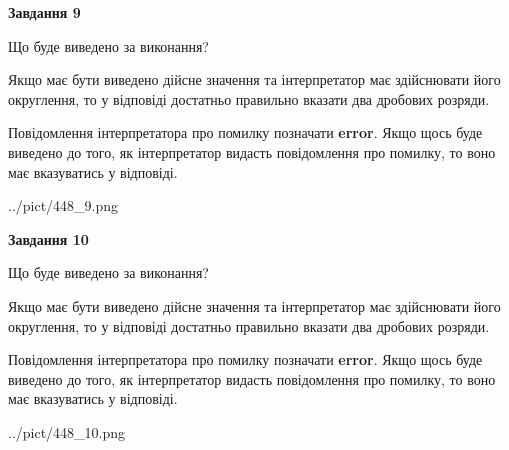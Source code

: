 \documentclass[12pt, ukrainian]{article}
\begin{document}
{\begin {Large}
{\begin {center}\textbf{Завдання 9}\end {center}}\par
Що буде виведено за виконання? \par

Якщо має бути виведено дійсне значення та інтерпретатор має здійснювати його округлення, 
то у відповіді достатньо правильно вказати два дробових розряди.

Повідомлення інтерпретатора про помилку позначати \textbf{error}.
Якщо щось буде виведено до того, як інтерпретатор видасть повідомлення про помилку, 
то воно має вказуватись у відповіді. \par

\begin{center}
	{../pict/448_9.png}
\end{center}
\newpage

{\begin {center}\textbf{Завдання 10}\end {center}}\par
Що буде виведено за виконання? \par

Якщо має бути виведено дійсне значення та інтерпретатор має здійснювати його округлення, 
то у відповіді достатньо правильно вказати два дробових розряди.

Повідомлення інтерпретатора про помилку позначати \textbf{error}.
Якщо щось буде виведено до того, як інтерпретатор видасть повідомлення про помилку, 
то воно має вказуватись у відповіді. \par

\begin{center}
	{../pict/448_10.png}
\end{center}
\newpage

\end {Large}}
\end{document}
